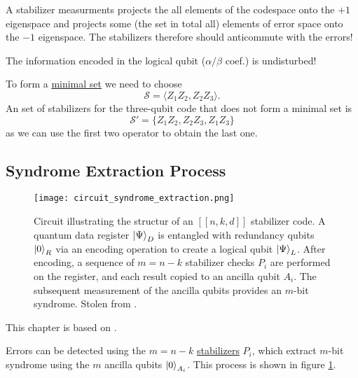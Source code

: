 A stabilizer measurments projects the all elements of the codespace onto the $+1$ eigenspace 
and projects some (the set in total all) elements of error space onto the $-1$ eigenspace. 
The stabilizers therefore should anticommute with the errors! 

The information encoded in the logical qubit ($\alpha/\beta$ coef.) is undisturbed!

To form a \hyperref[sec:basic.math.minimal_set]{minimal set} we need to choose
\begin{equation}
    \mathcal{S} = \langle Z_1 Z_2, Z_2 Z_3 \rangle.
\end{equation}
An set of stabilizers for the three-qubit code that does not form a minimal set is
\begin{equation}
    \mathcal{S}' = \{ Z_1 Z_2, Z_2 Z_3, Z_1 Z_3\}
\end{equation}
as we can use the first two operator to obtain the last one. 

\subsection{Syndrome Extraction Process}\label{sec:basic.qc.syndrome_extraction_process}

\begin{figure}[h]
    \begin{center}
        \texttt{[image: circuit\_syndrome\_extraction.png]}
    \end{center}
    \caption{
        Circuit illustrating the structur of an $[[n,k,d]]$ stabilizer code. 
        A quantum data register $\ket{\Psi}_D$ is entangled with redundancy qubits $\ket{0}_R$ via an encoding operation to create a logical qubit $\ket{\Psi}_L$.
        After encoding, a sequence of $m = n - k$ stabilizer checks $P_i$ are performed on the register, and each result copied to an ancilla qubit $A_i$.         
        The subsequent measurement of the ancilla qubits provides an $m$-bit syndrome.
        Stolen from \cite{QECintro}.
    }

    \label{fig:basic.qc.syndrome_extraction.circuit}
\end{figure}

This chapter is based on \cite{QECintro}.

Errors can be detected using the $m=n-k$ \hyperref[sec:basic.qc.stabilizer]{stabilizers} $P_i$, which extract $m$-bit syndrome using the $m$ ancilla qubits $\ket{0}_{A_i}$.
This process is shown in figure \ref{fig:basic.qc.syndrome_extraction.circuit}.

